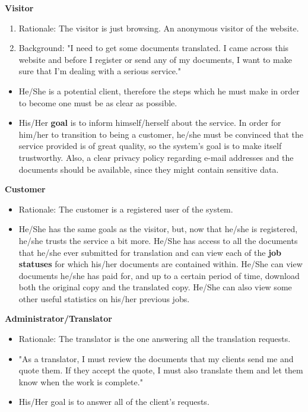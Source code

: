\documentclass{l3proj}
\begin{document}
\textbf{Visitor}
\begin{enumerate}
\item{Rationale: The visitor is just browsing. An anonymous visitor of the website.}
\item{Background: "I need to get some documents translated. I came across this
website and before I register or send any of my documents, I want to make sure
that I'm dealing with a serious service."}
\end{enumerate}
\begin{itemize}
\item{He/She is a potential client, therefore the steps which he must make in
order to become one must be as clear as possible.}
\item{His/Her \textbf{goal} is to inform himself/herself about the service. In
order for him/her to transition to being a customer, he/she must be convinced
that the service provided is of great quality, so the system's goal is to make
itself trustworthy. Also, a clear privacy policy regarding e-mail addresses and
the documents should be available, since they might contain sensitive data.}
\end{itemize}
\textbf{Customer}
\begin{itemize}
\item{Rationale: The customer is a registered user of the system.}
\item{He/She has the same goals as the visitor, but, now that he/she is
registered, he/she trusts the service a bit more. He/She has access to all the
documents that he/she ever submitted for translation and can view each of the
\textbf{job statuses} for which his/her documents are contained within. He/She
can view documents he/she has paid for, and up to a certain period of time,
download both the original copy and the translated copy. He/She can also view
some other useful statistics on his/her previous jobs.}
\end{itemize}
\textbf{Administrator/Translator}
\begin{itemize}
\item{Rationale: The translator is the one answering all the translation requests.}
\item{"As a translator, I must review the documents that my clients send me and
quote them. If they accept the quote, I must also translate them and let them
know when the work is complete."}
\item{His/Her goal is to answer all of the client's requests.}
\end{itemize}
\end{document}
